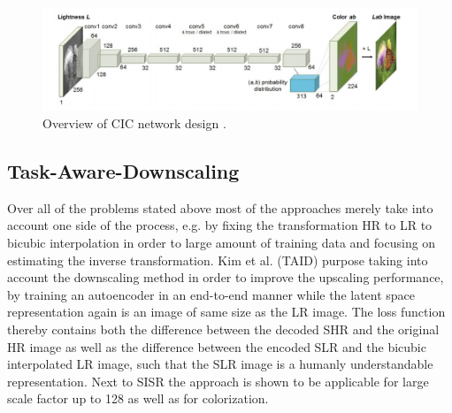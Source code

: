 \begin{figure}[!htbp]
	\centering
	\includegraphics[width=14cm]{figures/cic}
	\caption{Overview of CIC network design \cite{CIC}.}
  \label{fig:cic}
\end{figure}

\subsection{Task-Aware-Downscaling}
Over all of the problems stated above most of the approaches merely take into
account one side of the process, e.g. by fixing the transformation HR to LR
to bicubic interpolation in order to large amount of training data and focusing
on estimating the inverse transformation. Kim et al. \cite{TAID} (TAID) purpose taking
into account the downscaling method in order to improve the upscaling performance,
by training an autoencoder in an end-to-end manner while the latent space
representation again is an image of same size as the LR image. The loss function
thereby contains both the difference between the decoded SHR and the original HR
image as well as the difference between the encoded SLR and the bicubic
interpolated LR image, such that the SLR image is a humanly understandable
representation. Next to SISR the approach is shown to be applicable for large
scale factor up to 128 as well as for colorization.


%
